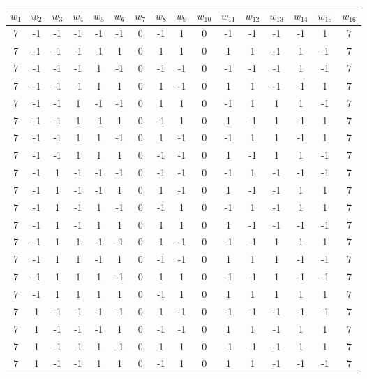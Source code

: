 \documentclass[12pt]{article}
\theoremstyle{plain}
\theoremstyle{definition}
\theoremstyle{remark}
\theoremstyle{definition}
\begin{document}
\begin{center}
\begin{tabular}{|c|c|c|c|c|c|c|c|c|c|c|c|c|c|c|c|} 
\hline
$w_{1}$ & $w_{2}$ & $w_{3}$ & $w_{4}$ & $w_{5}$ & $w_{6}$ & $w_{7}$ & $w_{8}$ & $w_{9}$ & $w_{10}$ & $w_{11}$ & $w_{12}$ & $w_{13}$ & $w_{14}$ & $w_{15}$ & $w_{16}$ \\
\hline
7 & -1 & -1 & -1 & -1 & -1 & 0 & -1 & 1 & 0 & -1 & -1 & -1 & -1 & 1 & 7 \\
7 & -1 & -1 & -1 & -1 & 1 & 0 & 1 & 1 & 0 & 1 & 1 & -1 & 1 & -1 & 7 \\
7 & -1 & -1 & -1 & 1 & -1 & 0 & -1 & -1 & 0 & -1 & -1 & -1 & 1 & -1 & 7 \\
7 & -1 & -1 & -1 & 1 & 1 & 0 & 1 & -1 & 0 & 1 & 1 & -1 & -1 & 1 & 7 \\
7 & -1 & -1 & 1 & -1 & -1 & 0 & 1 & 1 & 0 & -1 & 1 & 1 & 1 & -1 & 7 \\
7 & -1 & -1 & 1 & -1 & 1 & 0 & -1 & 1 & 0 & 1 & -1 & 1 & -1 & 1 & 7 \\
7 & -1 & -1 & 1 & 1 & -1 & 0 & 1 & -1 & 0 & -1 & 1 & 1 & -1 & 1 & 7 \\
7 & -1 & -1 & 1 & 1 & 1 & 0 & -1 & -1 & 0 & 1 & -1 & 1 & 1 & -1 & 7 \\
7 & -1 & 1 & -1 & -1 & -1 & 0 & -1 & -1 & 0 & -1 & 1 & -1 & -1 & -1 & 7 \\
7 & -1 & 1 & -1 & -1 & 1 & 0 & 1 & -1 & 0 & 1 & -1 & -1 & 1 & 1 & 7 \\
7 & -1 & 1 & -1 & 1 & -1 & 0 & -1 & 1 & 0 & -1 & 1 & -1 & 1 & 1 & 7 \\
7 & -1 & 1 & -1 & 1 & 1 & 0 & 1 & 1 & 0 & 1 & -1 & -1 & -1 & -1 & 7 \\
7 & -1 & 1 & 1 & -1 & -1 & 0 & 1 & -1 & 0 & -1 & -1 & 1 & 1 & 1 & 7 \\
7 & -1 & 1 & 1 & -1 & 1 & 0 & -1 & -1 & 0 & 1 & 1 & 1 & -1 & -1 & 7 \\
7 & -1 & 1 & 1 & 1 & -1 & 0 & 1 & 1 & 0 & -1 & -1 & 1 & -1 & -1 & 7 \\
7 & -1 & 1 & 1 & 1 & 1 & 0 & -1 & 1 & 0 & 1 & 1 & 1 & 1 & 1 & 7 \\
7 & 1 & -1 & -1 & -1 & -1 & 0 & 1 & -1 & 0 & -1 & -1 & -1 & -1 & -1 & 7 \\
7 & 1 & -1 & -1 & -1 & 1 & 0 & -1 & -1 & 0 & 1 & 1 & -1 & 1 & 1 & 7 \\
7 & 1 & -1 & -1 & 1 & -1 & 0 & 1 & 1 & 0 & -1 & -1 & -1 & 1 & 1 & 7 \\
7 & 1 & -1 & -1 & 1 & 1 & 0 & -1 & 1 & 0 & 1 & 1 & -1 & -1 & -1 & 7 \\

\end{tabular}
\end{center}
\end{document}
